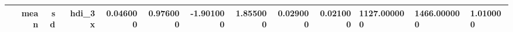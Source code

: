 \begin{tabular}{lrrrrrrrrr}
\toprule
 & mean & sd & hdi_3%
\midrule
x & 0.046000 & 0.976000 & -1.901000 & 1.855000 & 0.029000 & 0.021000 & 1127.000000 & 1466.000000 & 1.010000 \\
\bottomrule
\end{tabular}

